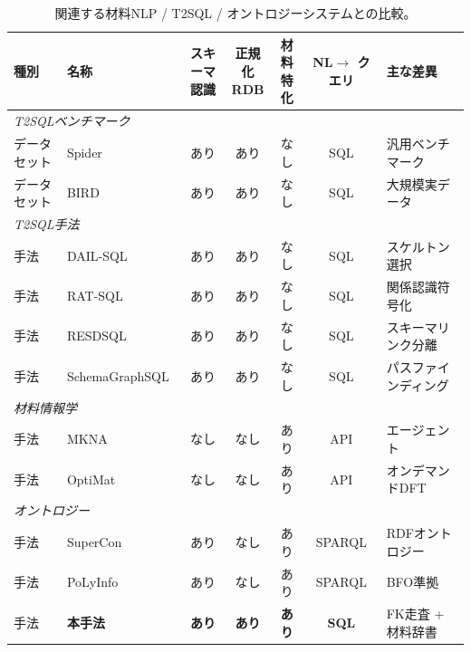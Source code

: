 \documentclass[5p,twocolumn]{elsarticle}
\begin{document}
\begin{table}[htbp]
  \centering
  \caption{関連する材料NLP / T2SQL / オントロジーシステムとの比較。}
  \label{tab:related_comparison}
  \small
  \begin{tabularx}{\textwidth}{llccccX}
    \toprule
    種別 & 名称 & \shortstack{スキーマ\\認識} & \shortstack{正規化\\RDB} & \shortstack{材料\\特化} & \shortstack{NL$\to$\\クエリ} & 主な差異 \\
    \midrule
    \multicolumn{7}{l}{\textit{T2SQLベンチマーク}} \\
    データセット & Spider~\cite{yu2018spider} & あり & あり & なし & SQL & 汎用ベンチマーク \\
    データセット & BIRD~\cite{li2024bird} & あり & あり & なし & SQL & 大規模実データ \\
    \midrule
    \multicolumn{7}{l}{\textit{T2SQL手法}} \\
    手法 & DAIL-SQL~\cite{gao2023dail} & あり & あり & なし & SQL & スケルトン選択 \\
    手法 & RAT-SQL~\cite{wang2020ratsql} & あり & あり & なし & SQL & 関係認識符号化 \\
    手法 & RESDSQL~\cite{li2023resdsql} & あり & あり & なし & SQL & スキーマリンク分離 \\
    手法 & SchemaGraphSQL~\cite{safdarian2026schemagraphsql} & あり & あり & なし & SQL & パスファインディング \\
    \midrule
    \multicolumn{7}{l}{\textit{材料情報学}} \\
    手法 & MKNA~\cite{zhuang2026mkna} & なし & なし & あり & API & エージェント \\
    手法 & OptiMat~\cite{hu2026optimat} & なし & なし & あり & API & オンデマンドDFT \\
    \midrule
    \multicolumn{7}{l}{\textit{オントロジー}} \\
    手法 & SuperCon~\cite{ishii2023supercon} & あり & なし & あり & SPARQL & RDFオントロジー \\
    手法 & PoLyInfo~\cite{ishii2024polyinfo} & あり & なし & あり & SPARQL & BFO準拠 \\
    \midrule
    手法 & \textbf{本手法} & \textbf{あり} & \textbf{あり} & \textbf{あり} & \textbf{SQL} & FK走査 + 材料辞書 \\
    \bottomrule
  \end{tabularx}
\end{table}
\end{document}
